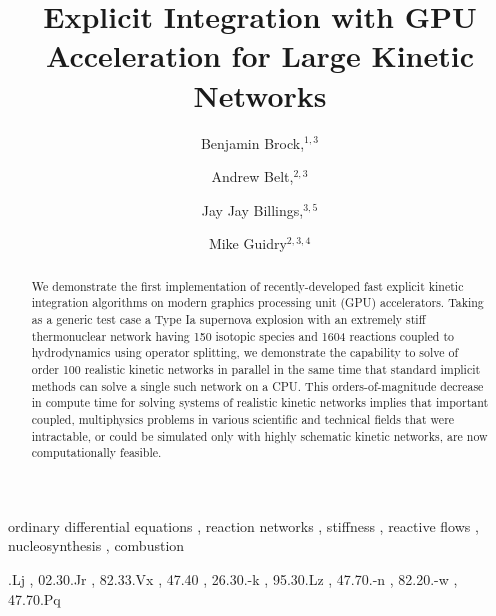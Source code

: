 \documentclass[]{elsart}
\begin{document}
\begin{frontmatter}

\title{Explicit Integration with GPU Acceleration for Large Kinetic Networks}

\author{
Benjamin Brock,$^{1,3}$}
\author{
Andrew Belt,$^{2,3}$}
\author{
Jay Jay Billings,$^{3,5}$}
\author{Mike Guidry$^{2,3,4}$
}


\address{$^1$Department of  Electrical Engineering and Computer Science, 
University of Tennessee, Knoxville, TN 37996-1200, USA}
\address{$^2$Department of Physics and Astronomy, University of Tennessee,
Knoxville, TN 37996-1200, USA}
\address{$^3$Computer Science and Mathematics Division, Oak Ridge National
Laboratory, Oak Ridge, TN 37830, USA}
\address{$^4$Physics Division, Oak Ridge National Laboratory, Oak Ridge, TN
37830, USA}
\address{$^5$The Bredesen Center for Interdisciplinary Research and Graduate
Education, University of Tennessee, Knoxville, TN 37996-1200, USA}



\begin{abstract} 
We demonstrate the first implementation of recently-developed fast explicit 
kinetic integration algorithms on modern graphics processing unit (GPU) 
accelerators. Taking as a generic test case a Type Ia supernova explosion with 
an extremely stiff thermonuclear network having 150 isotopic species and 1604 
reactions coupled to hydrodynamics using operator splitting, we demonstrate the 
capability to solve of order 100 realistic kinetic networks in parallel in the 
same time that standard implicit methods can solve a single such network on a 
CPU. This orders-of-magnitude decrease in compute time for solving systems of 
realistic kinetic networks implies that important coupled, multiphysics problems 
in various scientific and technical fields that were intractable, or could be 
simulated only with highly schematic kinetic networks, are now computationally 
feasible.
\end{abstract}

\begin{keyword}
ordinary differential equations 
\sep 
reaction networks 
\sep 
stiffness
\sep
reactive flows
\sep
nucleosynthesis
\sep
combustion

\vspace{1ex}

.Lj %
\sep
02.30.Jr %
\sep
82.33.Vx %
\sep
47.40 %
\sep
26.30.-k %
\sep
95.30.Lz %
\sep
47.70.-n %
\sep
82.20.-w %
\sep
47.70.Pq %

\end{keyword}

\end{frontmatter}
\end{document}
